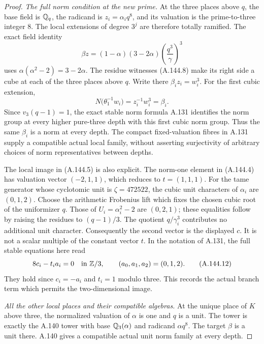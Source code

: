 \begin{proof}
\emph{The full norm condition at the new prime.}
At the three places above \(q\), the base
field is \(\mathbb Q_q\), the radicand is
\(z_i=\alpha_i q^8\), and its valuation is
the prime-to-three integer 8.
The local extensions of degree \(3^j\)
are therefore totally ramified.
The exact field identity
\[
 \beta z
   =(1-\alpha)(3-2\alpha)
                         \left(\frac{q^3}{\gamma}\right)^3
\tag{A.144.11}
\]
uses \(\alpha(\alpha^2-2)=3-2\alpha\).
The residue witnesses (A.144.8) make its
right side a cube at each of the three
places above \(q\).
Write there \(\beta_i z_i=w_i^3\).
For the first cubic extension,
\[
 N\bigl(\theta_1^{-1}w_i\bigr)
                           =z_i^{-1}w_i^3=\beta_i .
\]
Since \(v_3(q-1)=1\), the exact stable norm
formula A.131 identifies the norm group
at every higher pure-three depth with
this first cubic norm group.
Thus the same \(\beta_i\) is a norm at
every depth.
The compact fixed-valuation fibres in
A.131 supply a compatible actual local
family, without asserting surjectivity
of arbitrary choices of norm representatives
between depths.

The local image in (A.144.5) is also
explicit.
The norm-one element in (A.144.4) has
valuation vector \((-2,1,1)\), which
reduces to \(t=(1,1,1)\).
For the tame generator whose cyclotomic
unit is \(\zeta=472522\), the cubic
unit characters of \(\alpha_i\) are
\((0,1,2)\).
Choose the arithmetic Frobenius lift
which fixes the chosen cubic root of
the uniformizer \(q\).
Those of \(U_i=\alpha_i^2-2\) are
\((0,2,1)\); these equalities follow
by raising the residues to \((q-1)/3\).
The quotient \(q/\gamma_i^3\) contributes
no additional unit character.
Consequently the second vector is the
displayed \(c\).
It is not a scalar multiple of the
constant vector \(t\).
In the notation of A.131, the full
stable equations here read
\[
       8c_i-t_i a_i=0\quad\text{in }\mathbb Z/3,
           \qquad (a_0,a_1,a_2)=(0,1,2).
\tag{A.144.12}
\]
They hold since \(c_i=-a_i\) and \(t_i=1\)
modulo three.
This records the actual branch term
which permits the two-dimensional image.

\emph{All the other local places and their compatible algebras.}
At the unique place of \(K\) above three,
the normalized valuation of \(\alpha\)
is one and \(q\) is a unit.
The tower is exactly the A.140 tower
with base \(\mathbb Q_3(\alpha)\) and radicand
\(\alpha q^8\).
The target \(\beta\) is a unit there.
A.140 gives a compatible actual unit
norm family at every depth.


\end{proof}
